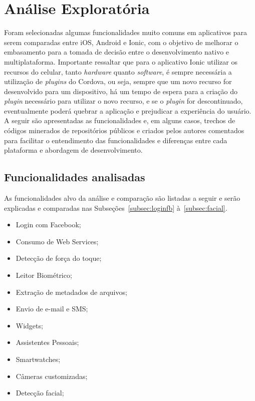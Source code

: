 \chapter{Análise Exploratória} \label{cap:analise_exploratoria}


Foram selecionadas algumas funcionalidades muito comuns em aplicativos para serem comparadas entre iOS, Android e Ionic, com o objetivo de melhorar o embasamento para a tomada de decisão entre o desenvolvimento 
nativo e multiplataforma. Importante ressaltar que para o aplicativo Ionic utilizar os recursos do celular, tanto \textit{hardware} quanto \textit{software}, é sempre necessária a utilização de 
\textit{plugins} do Cordova, ou seja, sempre que um novo recurso for desenvolvido para um dispositivo, há um tempo de espera para a criação do \textit{plugin} necessário para utilizar o novo recurso, 
e se o \textit{plugin} for descontinuado, eventualmente poderá quebrar a aplicação e prejudicar a experiência do usuário. A seguir são apresentadas as funcionalidades e, em alguns casos, trechos de códigos minerados 
de repositórios públicos e criados pelos autores comentados para facilitar o entendimento das funcionalidades e diferenças entre cada plataforma e abordagem de desenvolvimento. 

\section{Funcionalidades analisadas}\label{sec:intro_analise_exp}

As funcionalidades alvo da análise e comparação são listadas a seguir e serão explicadas e comparadas nas Subseções~\ref{subsec:loginfb} à~\ref{subsec:facial}. 

\begin{itemize}
	\item Login com Facebook;
	\item Consumo de Web Services;
	\item Detecção de força do toque;
	\item Leitor Biométrico;
	\item Extração de metadados de arquivos;
	\item Envio de e-mail e SMS;
	\item Widgets;
	\item Assistentes Pessoais;
	\item Smartwatches;
	\item Câmeras customizadas;
	\item Detecção facial;
\end{itemize}

